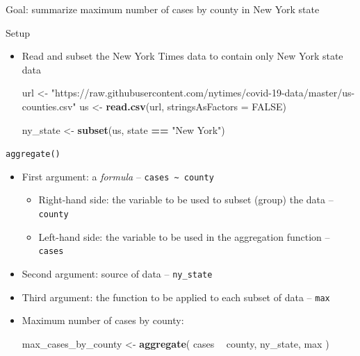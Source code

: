 \documentclass[
]{book}
\newenvironment{Shaded}{\begin{snugshade}}{\end{snugshade}}
\newcommand{\DataTypeTok}[1]{\textcolor[rgb]{0.13,0.29,0.53}{#1}}
\newcommand{\KeywordTok}[1]{\textcolor[rgb]{0.13,0.29,0.53}{\textbf{#1}}}
\newcommand{\NormalTok}[1]{#1}
\newcommand{\OperatorTok}[1]{\textcolor[rgb]{0.81,0.36,0.00}{\textbf{#1}}}
\newcommand{\OtherTok}[1]{\textcolor[rgb]{0.56,0.35,0.01}{#1}}
\newcommand{\StringTok}[1]{\textcolor[rgb]{0.31,0.60,0.02}{#1}}
\begin{document}
Goal: summarize maximum number of cases by county in New York state

Setup

\begin{itemize}
\item
  Read and subset the New York Times data to contain only New York state data

\begin{Shaded}
\begin{Highlighting}[]
\NormalTok{url <-}\StringTok{ "https://raw.githubusercontent.com/nytimes/covid-19-data/master/us-counties.csv"}
\NormalTok{us <-}\StringTok{ }\KeywordTok{read.csv}\NormalTok{(url, }\DataTypeTok{stringsAsFactors =} \OtherTok{FALSE}\NormalTok{)}
\end{Highlighting}
\end{Shaded}

\begin{Shaded}
\begin{Highlighting}[]
\NormalTok{ny_state <-}\StringTok{ }\KeywordTok{subset}\NormalTok{(us, state }\OperatorTok{==}\StringTok{ "New York"}\NormalTok{)}
\end{Highlighting}
\end{Shaded}
\end{itemize}

\texttt{aggregate()}

\begin{itemize}
\item
  First argument: a \emph{formula} -- \texttt{cases\ \textasciitilde{}\ county}

  \begin{itemize}
  \item
    Right-hand side: the variable to be used to subset (group) the data -- \texttt{county}
  \item
    Left-hand side: the variable to be used in the aggregation function -- \texttt{cases}
  \end{itemize}
\item
  Second argument: source of data -- \texttt{ny\_state}
\item
  Third argument: the function to be applied to each subset of data -- \texttt{max}
\item
  Maximum number of cases by county:

\begin{Shaded}
\begin{Highlighting}[]
\NormalTok{max_cases_by_county <-}\StringTok{ }\KeywordTok{aggregate}\NormalTok{( cases }\OperatorTok{~}\StringTok{ }\NormalTok{county, ny_state, max )}
\end{Highlighting}
\end{Shaded}
\end{itemize}
\end{document}
